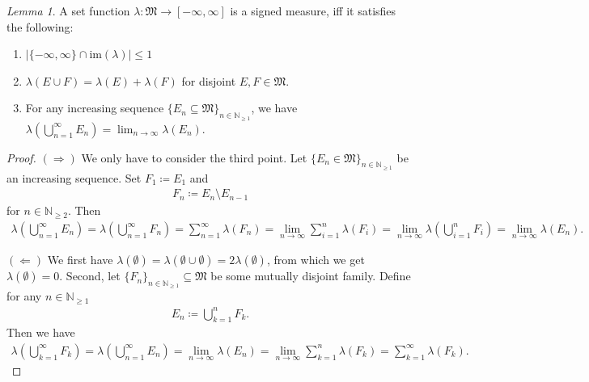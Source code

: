 \documentclass[10pt, leqno]{amsart}
\theoremstyle{definition}
\theoremstyle{remark}
\newtheorem{lemma}[theorem]{Lemma}
\begin{document}
    \begin{lemma} \label{lem:limit_characterization_of_signed_measures}
        A set function \(\lambda\colon \mathfrak{M} \to [-\infty, \infty]\) is a signed measure, iff it satisfies the following:
        \begin{enumerate}[label=(\roman*)]
            \item \(|\{-\infty, \infty\} \cap \text{im}(\lambda)| \leq 1\)
            \item \(\lambda(E \cup F) = \lambda(E) + \lambda(F)\) for disjoint \(E, F \in \mathfrak{M}\).
            \item For any increasing sequence \(\{E_n \subseteq \mathfrak{M}\}_{n \in \mathbb{N}_{\geq 1}}\), we have \(\lambda\left(\bigcup_{n=1}^\infty E_n\right) = \lim_{n \to \infty} \lambda(E_n)\).
        \end{enumerate}
    \end{lemma}

    \begin{proof}
        \((\Rightarrow)\) We only have to consider the third point. Let \(\{E_n \in \mathfrak{M}\}_{n \in \mathbb{N}_{\geq 1}}\) be an increasing sequence. Set \(F_1 \coloneqq E_1\) and
        \begin{align}
            F_n \coloneqq E_n \setminus E_{n-1}
        \end{align}
        for \(n \in \mathbb{N}_{\geq 2}\). Then
        \begin{align}
            \lambda\left(\bigcup_{n=1}^\infty E_n\right) = \lambda\left(\bigcup_{n=1}^\infty F_n\right) = \sum_{n=1}^\infty \lambda(F_n) = \lim_{n \to \infty} \sum_{i=1}^n \lambda(F_i) = \lim_{n \to \infty} \lambda\left(\bigcup_{i=1}^n F_i\right) = \lim_{n \to \infty} \lambda(E_n).
        \end{align}

        \((\Leftarrow)\) We first have \(\lambda(\emptyset) = \lambda(\emptyset \cup \emptyset) = 2\lambda(\emptyset)\), from which we get \(\lambda(\emptyset) = 0\). Second, let \(\{F_n\}_{n \in \mathbb{N}_{\geq 1}} \subseteq \mathfrak{M}\) be some mutually disjoint family. Define for any \(n \in \mathbb{N}_{\geq 1}\)
        \begin{align}
            E_n \coloneqq \bigcup_{k=1}^n F_k.
        \end{align}
        Then we have
        \begin{align}
            \lambda\left(\bigcup_{k=1}^\infty F_k\right) = \lambda\left(\bigcup_{n=1}^\infty E_n\right) = \lim_{n \to \infty} \lambda(E_n) = \lim_{n \to \infty} \sum_{k=1}^n \lambda(F_k) = \sum_{k=1}^\infty \lambda(F_k).    
        \end{align}
    \end{proof}
\end{document}
